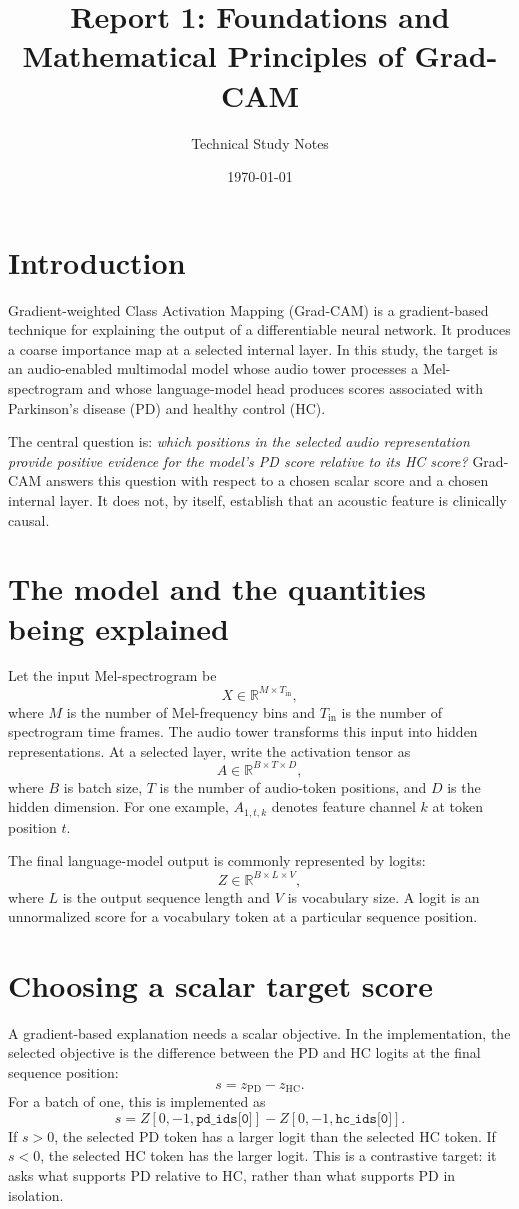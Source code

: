 \documentclass[11pt,a4paper]{article}
\title{Report 1: Foundations and Mathematical Principles of Grad-CAM}
\author{Technical Study Notes}
\date{\today}
\begin{document}
\maketitle
\tableofcontents
\newpage
\section{Introduction}
Gradient-weighted Class Activation Mapping (Grad-CAM) is a gradient-based technique for explaining the output of a differentiable neural network. It produces a coarse importance map at a selected internal layer. In this study, the target is an audio-enabled multimodal model whose audio tower processes a Mel-spectrogram and whose language-model head produces scores associated with Parkinson's disease (PD) and healthy control (HC).

The central question is: \emph{which positions in the selected audio representation provide positive evidence for the model's PD score relative to its HC score?} Grad-CAM answers this question with respect to a chosen scalar score and a chosen internal layer. It does not, by itself, establish that an acoustic feature is clinically causal.

\section{The model and the quantities being explained}
Let the input Mel-spectrogram be
\[
X\in\mathbb{R}^{M\times T_{\mathrm{in}}},
\]
where $M$ is the number of Mel-frequency bins and $T_{\mathrm{in}}$ is the number of spectrogram time frames. The audio tower transforms this input into hidden representations. At a selected layer, write the activation tensor as
\[
A\in\mathbb{R}^{B\times T\times D},
\]
where $B$ is batch size, $T$ is the number of audio-token positions, and $D$ is the hidden dimension. For one example, $A_{1,t,k}$ denotes feature channel $k$ at token position $t$.

The final language-model output is commonly represented by logits:
\[
Z\in\mathbb{R}^{B\times L\times V},
\]
where $L$ is the output sequence length and $V$ is vocabulary size. A logit is an unnormalized score for a vocabulary token at a particular sequence position.

\section{Choosing a scalar target score}
A gradient-based explanation needs a scalar objective. In the implementation, the selected objective is the difference between the PD and HC logits at the final sequence position:
\[
s=z_{\mathrm{PD}}-z_{\mathrm{HC}}.
\]
For a batch of one, this is implemented as
\[
s=Z[0,-1,\texttt{pd\_ids[0]}]
 -Z[0,-1,\texttt{hc\_ids[0]}].
\]
If $s>0$, the selected PD token has a larger logit than the selected HC token. If $s<0$, the selected HC token has the larger logit. This is a contrastive target: it asks what supports PD relative to HC, rather than what supports PD in isolation.
\end{document}
